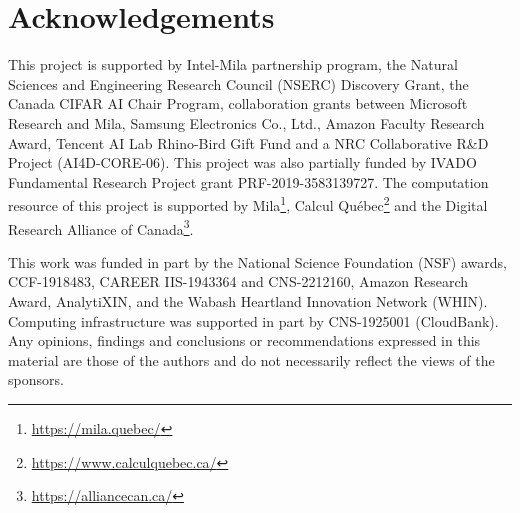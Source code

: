 \section*{Acknowledgements}

This project is supported by Intel-Mila partnership program, the Natural Sciences and Engineering Research Council (NSERC) Discovery Grant, the Canada CIFAR AI Chair Program, collaboration grants between Microsoft Research and Mila, Samsung Electronics Co., Ltd., Amazon Faculty Research Award, Tencent AI Lab Rhino-Bird Gift Fund and a NRC Collaborative R\&D Project (AI4D-CORE-06). This project was also partially funded by IVADO Fundamental Research Project grant PRF-2019-3583139727. The computation resource of this project is supported by Mila\footnote{\url{https://mila.quebec/}}, Calcul Qu\'ebec\footnote{\url{https://www.calculquebec.ca/}} and the Digital Research Alliance of Canada\footnote{\url{https://alliancecan.ca/}}.

This work was funded in part by the National Science Foundation (NSF) awards, CCF-1918483, CAREER IIS-1943364 and CNS-2212160, Amazon Research Award, AnalytiXIN, and the Wabash Heartland Innovation Network (WHIN). Computing infrastructure was supported in part by CNS-1925001 (CloudBank). Any opinions, findings and conclusions or recommendations expressed in this material are those of the authors and do not necessarily reflect the views of the sponsors.